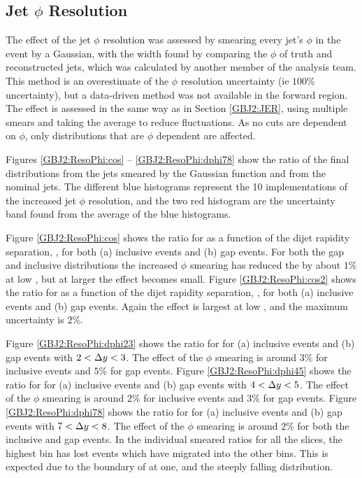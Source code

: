 \subsection{Jet $\phi{}$ Resolution}
\label{GBJ2:JPhiR}

The effect of the jet $\phi$ resolution was assessed by smearing every jet's $\phi$ in the event by a Gaussian, with the width found by comparing the $\phi$ of truth and reconstructed jets, which was calculated by another member of the analysis team. 
This method is an overestimate of the $\phi$ resolution uncertainty (ie $100\%$ uncertainty), but a data-driven method was not available in the forward region.
The effect is assessed in the same way as in Section \ref{GBJ2:JER}, using multiple smears and taking the average to reduce fluctuations. 
As no cuts are dependent on $\phi$, only distributions that are $\phi$ dependent are affected.

Figures \ref{GBJ2:ResoPhi:cos} -- \ref{GBJ2:ResoPhi:dphi78} show the ratio of the final distributions from the jets smeared by the Gaussian function and from the nominal jets.
The different blue histograms represent the 10 implementations of the increased jet $\phi$ resolution, and the two red histogram are the uncertainty band found from the average of the blue histograms.

Figure \ref{GBJ2:ResoPhi:cos} shows the ratio for \mean{\cosdphi{}} as a function of the dijet rapidity separation, \dy{}, for both (a) inclusive events and (b) gap events.
For both the gap and inclusive distributions the increased $\phi$ smearing has reduced the \mean{\cosdphi{}} by about $1\%$ at low \dy{}, but at larger \dy{} the effect becomes small.
Figure \ref{GBJ2:ResoPhi:cos2} shows the ratio for \mean{\costwodphi{}} as a function of the dijet rapidity separation, \dy{}, for both (a) inclusive events and (b) gap events.
Again the effect is largest at low \dy{}, and the maximum uncertainty is  $2\%$. 

Figure \ref{GBJ2:ResoPhi:dphi23} shows the ratio for \dphiDist{} for (a) inclusive events and (b) gap events with $2<\mbox{$\Delta y$}{}<3$.
The effect of the $\phi$ smearing is around  $3\%$ for inclusive events and  $5\%$ for gap events.
Figure \ref{GBJ2:ResoPhi:dphi45} shows the ratio for \dphiDist{} for (a) inclusive events and (b) gap events with $4<\mbox{$\Delta y$}{}<5$.
The effect of the $\phi$ smearing is around  $2\%$ for inclusive events and  $3\%$ for gap events.
Figure \ref{GBJ2:ResoPhi:dphi78} shows the ratio for \dphiDist{} for (a) inclusive events and (b) gap events with $7<\mbox{$\Delta y$}{}<8$.
The effect of the $\phi$ smearing is around  $2\%$ for both the inclusive and gap events.
In the \dphi{} individual smeared ratios for all the \dy{} slices, the highest \dphi{} bin has lost events which have migrated into the other \dphi{} bins. 
This is expected due to the boundary of \dphi{} at one, and the steeply falling \dphi{} distribution.


